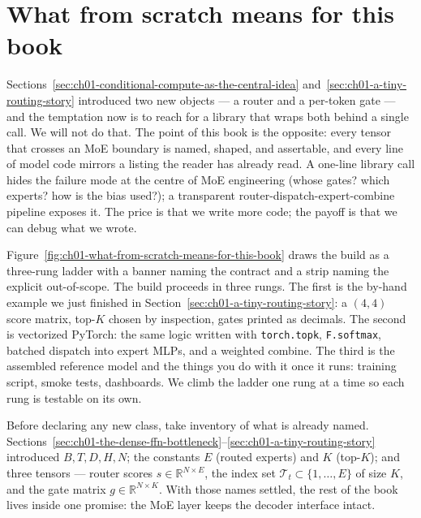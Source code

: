 \section{What from scratch means for this book}
\label{sec:ch01-what-from-scratch-means-for-this-book}

Sections~\ref{sec:ch01-conditional-compute-as-the-central-idea} and~\ref{sec:ch01-a-tiny-routing-story} introduced two new objects --- a router and a per-token gate --- and the temptation now is to reach for a library that wraps both behind a single call. We will not do that. The point of this book is the opposite: every tensor that crosses an MoE boundary is named, shaped, and assertable, and every line of model code mirrors a listing the reader has already read. A one-line library call hides the failure mode at the centre of MoE engineering (whose gates? which experts? how is the bias used?); a transparent router-dispatch-expert-combine pipeline exposes it. The price is that we write more code; the payoff is that we can debug what we wrote.



Figure~\ref{fig:ch01-what-from-scratch-means-for-this-book} draws the build as a three-rung ladder with a banner naming the contract and a strip naming the explicit out-of-scope. The build proceeds in three rungs. The first is the by-hand example we just finished in Section~\ref{sec:ch01-a-tiny-routing-story}: a $(4, 4)$ score matrix, top-$K$ chosen by inspection, gates printed as decimals. The second is vectorized PyTorch: the same logic written with \texttt{torch.topk}, \texttt{F.softmax}, batched dispatch into expert MLPs, and a weighted combine. The third is the assembled reference model and the things you do with it once it runs: training script, smoke tests, dashboards. We climb the ladder one rung at a time so each rung is testable on its own.

Before declaring any new class, take inventory of what is already named. Sections~\ref{sec:ch01-the-dense-ffn-bottleneck}--\ref{sec:ch01-a-tiny-routing-story} introduced $B, T, D, H, N$; the constants $E$ (routed experts) and $K$ (top-$K$); and three tensors --- router scores $s \in \mathbb{R}^{N \times E}$, the index set $\mathcal{T}_t \subset \{1,\dots,E\}$ of size $K$, and the gate matrix $g \in \mathbb{R}^{N \times K}$. With those names settled, the rest of the book lives inside one promise: the MoE layer keeps the decoder interface intact.



